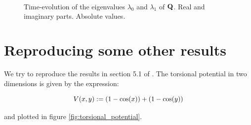 \begin{figure}
  \centering
   \\
  \caption[Eigenvalues of $Q$]{
    Time-evolution of the eigenvalues $\lambda_0$ and $\lambda_1$ of $\mathbf{Q}$.
     Real and imaginary parts.
     Absolute values.
    \label{fig:hofp_ev_Q}
  }
\end{figure}


\FloatBarrier
\section{Reproducing some other results}

We try to reproduce the results in section 5.1 of \cite{FGL_semiclassical_dynamics}.
The torsional potential in two dimensions is given by the expression:

\begin{equation}
  V(x,y) := (1-\cos(x)) + (1-\cos(y))
\end{equation}

and plotted in figure \ref{fig:torsional_potential}.

